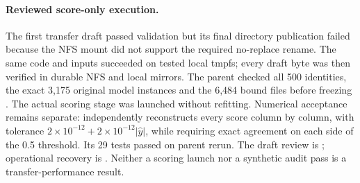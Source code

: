 \paragraph{Reviewed score-only execution.}
The first transfer draft passed validation but its final directory publication
failed because the NFS mount did not support the required no-replace rename.
The same code and inputs succeeded on tested local tmpfs; every draft byte was
then verified in durable NFS and local mirrors. The parent checked all 500
identities, the exact 3,175 original model instances and the 6,484 bound files
before freezing .
The actual scoring stage was launched without refitting. Numerical acceptance
remains separate:  independently
reconstructs every score column by column, with tolerance
$2\times10^{-12}+2\times10^{-12}|\hat y|$, while requiring exact agreement
on each side of the 0.5 threshold. Its 29 tests passed on parent rerun.
The draft review is ;
operational recovery is .
Neither a scoring launch nor a synthetic audit pass is a transfer-performance
result.
